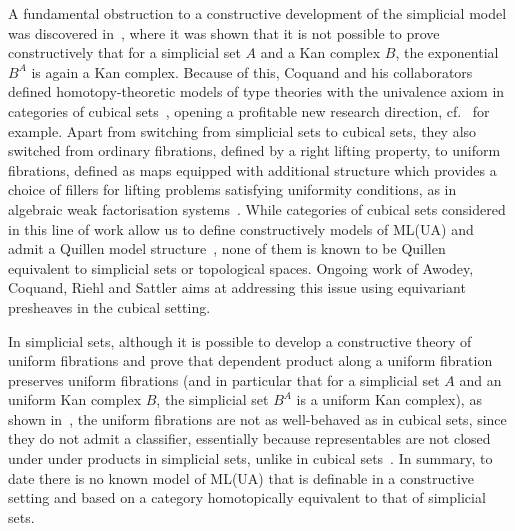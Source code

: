 \documentclass[reqno,10pt,a4paper,oneside]{amsart}
\numberwithin{equation}{section}
\theoremstyle{mythm}
\theoremstyle{mydef}
\theoremstyle{myrmk}
\begin{document}
A fundamental obstruction to a constructive development of  the simplicial model was discovered in~\cite{coquand-non-constructivity-kan}, where it was shown that
it is not possible to prove constructively that for a simplicial set $A$ and a
Kan complex $B$, the exponential~$B^A$ is again a Kan complex.
Because of this, Coquand and his collaborators  defined homotopy-theoretic models of type
theories with the univalence axiom in categories of cubical sets~\cite{coquand-cubical-sets}, opening a profitable new research direction, cf.~\cite{awodey-cubical,cohen-et-al:cubicaltt,PittsAM:aximct} for example. Apart from switching 
from simplicial sets to cubical sets, they also switched from ordinary fibrations, defined by a right lifting property,
to uniform fibrations, defined as maps equipped with additional structure which 
 provides a choice of fillers for lifting problems satisfying uniformity conditions, as in algebraic weak factorisation systems~\cite{garner:small-object-argument,grandis-tholen-nwfs}. While 
categories of cubical sets considered in this line of work allow us to define constructively models of 
ML(UA) and admit a Quillen
model structure~\cite{SattlerC:equepu}, none of them
 is known to be Quillen equivalent to simplicial sets or topological spaces. Ongoing work of Awodey, Coquand, Riehl and Sattler  aims at addressing this issue 
 using equivariant presheaves in the cubical setting.

In simplicial sets, although it is possible to develop  a constructive theory of uniform fibrations and prove that dependent product along a uniform fibration preserves
uniform fibrations (and in particular that for a simplicial set $A$ and an 
uniform Kan complex $B$, the simplicial set $B^A$ is a uniform Kan complex),
  as shown in~\cite{gambino2017frobenius}, the uniform fibrations
are not as well-behaved as in cubical sets,
since they do not admit a classifier, essentially because 
representables are not closed under under products in simplicial sets, unlike in cubical sets~\cite{SattlerC:faiaut}. 
In summary, to date there is no known model of ML(UA) that is definable in a constructive setting and
based on a category homotopically equivalent to that of simplicial sets. 

\smallskip
\end{document}
